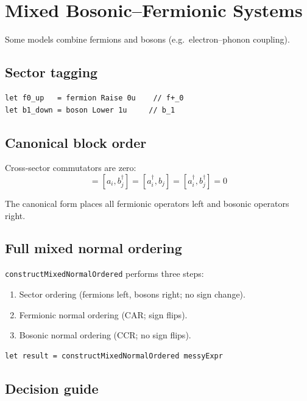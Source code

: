 \documentclass[10pt,a4paper]{article}
\begin{document}
\section{Mixed Bosonic--Fermionic Systems}\label{ch:mixed}

Some models combine fermions and bosons (e.g.\ electron--phonon
coupling).

\subsection{Sector tagging}

\begin{lstlisting}
let f0_up   = fermion Raise 0u    // f+_0
let b1_down = boson Lower 1u     // b_1
\end{lstlisting}

\subsection{Canonical block order}

Cross-sector commutators are zero:
%
\begin{equation}
[a_i, b_j] = [a_i, b_j^\dagger]
           = [a_i^\dagger, b_j]
           = [a_i^\dagger, b_j^\dagger] = 0
\end{equation}

The canonical form places all fermionic operators left and bosonic
operators right.

\subsection{Full mixed normal ordering}

\texttt{constructMixedNormalOrdered} performs three steps:
\begin{enumerate}[nosep]
  \item Sector ordering (fermions left, bosons right; no sign change).
  \item Fermionic normal ordering (CAR; sign flips).
  \item Bosonic normal ordering (CCR; no sign flips).
\end{enumerate}

\begin{lstlisting}
let result = constructMixedNormalOrdered messyExpr
\end{lstlisting}

\subsection{Decision guide}
\end{document}
